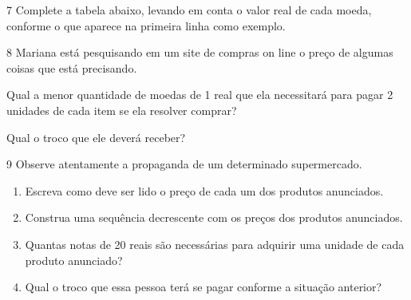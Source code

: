 \num{7} Complete a tabela abaixo, levando em conta o valor real de cada
moeda, conforme o que aparece na primeira linha como exemplo.

%

\num{8} Mariana está pesquisando em um site de compras on line o preço de
algumas coisas que está precisando.

%

\begin{escolha}
\item
  Qual a menor quantidade de moedas de 1 real que ela necessitará para
  pagar 2 unidades de cada item se ela resolver comprar?


\item
  Qual o troco que ele deverá receber?
\end{escolha}



\num{9} Observe atentamente a propaganda de um determinado supermercado.


\begin{enumerate}
\item
  Escreva como deve ser lido o preço de cada um dos produtos anunciados.


\item
  Construa uma sequência decrescente com os preços dos produtos
  anunciados.


\item
  Quantas notas de 20 reais são necessárias para adquirir uma unidade de
  cada produto anunciado?


\item
  Qual o troco que essa pessoa terá se pagar conforme a situação
  anterior?

\end{enumerate}

